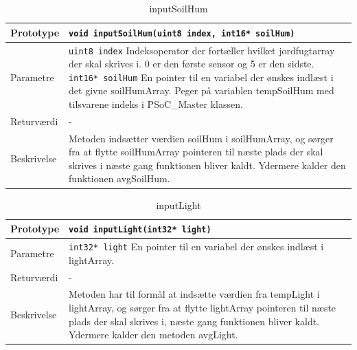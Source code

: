 
\begin{table}[h]
\begin{tabularx}{\textwidth}{| >{\raggedright\arraybackslash}p{2.5 cm} | >{\raggedright\arraybackslash}X |} \hline
Prototype & \texttt{void inputSoilHum(uint8 index, int16* soilHum)} \\\hline
Parametre & \texttt{uint8 index} \newline
Indeksoperator der fortæller hvilket jordfugtarray der skal skrives i. 0 er den første sensor og 5 er den sidste. \newline
\texttt{int16* soilHum} \newline
En pointer til en variabel der ønskes indlæst i det givne soilHumArray. Peger på variablen tempSoilHum med tilsvarene indeks i PSoC\_Master klassen. \\\hline
Returværdi & - \\\hline
Beskrivelse & Metoden indsætter værdien soilHum i soilHumArray, og sørger fra at flytte soilHumArray pointeren til næste plads der skal skrives i næste gang funktionen bliver kaldt. Ydermere kalder den funktionen avgSoilHum. \\\hline
\end{tabularx}
\caption{inputSoilHum}
\label{table:inputSoilHum}
\end{table}


\begin{table}[h]
\begin{tabularx}{\textwidth}{| >{\raggedright\arraybackslash}p{2.5 cm} | >{\raggedright\arraybackslash}X |} \hline
Prototype & \texttt{void inputLight(int32* light)} \\\hline
Parametre & \texttt{int32* light} \newline
En pointer til en variabel der ønskes indlæst i lightArray. \\\hline
Returværdi & - \\\hline
Beskrivelse & Metoden har til formål at indsætte værdien fra tempLight i lightArray, og sørger fra at flytte lightArray pointeren til næste plads der skal skrives i, næste gang funktionen bliver kaldt. Ydermere kalder den metoden avgLight.  \\\hline
\end{tabularx}
\caption{inputLight}
\label{table:inputLight}
\end{table}


